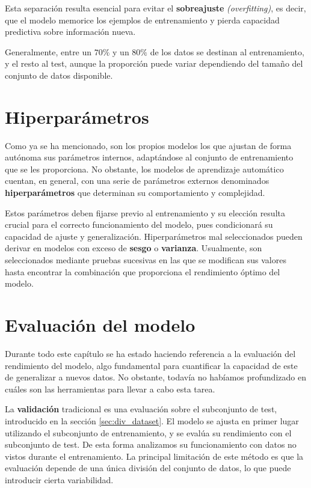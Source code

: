 \documentclass[titlepage, 11pt]{book}
\begin{document}
Esta separación resulta esencial para evitar el \textbf{sobreajuste} \textit{(overfitting)}, es decir, que el modelo memorice los ejemplos de entrenamiento y pierda capacidad predictiva sobre información nueva.

Generalmente, entre un $70\%$ y un $80\%$ de los datos se destinan al entrenamiento, y el resto al test, aunque la proporción puede variar dependiendo del tamaño del conjunto de datos disponible.

\section{Hiperparámetros}
Como ya se ha mencionado, son los propios modelos los que ajustan de forma autónoma sus parámetros internos, adaptándose al conjunto de entrenamiento que se les proporciona. No obstante, los modelos de aprendizaje automático cuentan, en general, con una serie de parámetros externos denominados \textbf{hiperparámetros} que determinan su comportamiento y complejidad.

Estos parámetros deben fijarse previo al entrenamiento y su elección resulta crucial para el correcto funcionamiento del modelo, pues condicionará su capacidad de ajuste y generalización. Hiperparámetros mal seleccionados pueden derivar en modelos con exceso de \textbf{sesgo} o \textbf{varianza}. Usualmente, son seleccionados mediante pruebas sucesivas en las que se modifican sus valores hasta encontrar la combinación que proporciona el rendimiento óptimo del modelo.

\section{Evaluación del modelo}
Durante todo este capítulo se ha estado haciendo referencia a la evaluación del rendimiento del modelo, algo fundamental para cuantificar la capacidad de este de generalizar a nuevos datos. No obstante, todavía no habíamos profundizado en cuáles son las herramientas para llevar a cabo esta tarea.

La \textbf{validación} tradicional es una evaluación sobre el subconjunto de test, introducido en la sección \ref{sec:div_dataset}. El modelo se ajusta en primer lugar utilizando el subconjunto de entrenamiento, y se evalúa su rendimiento con el subconjunto de test. De esta forma analizamos su funcionamiento con datos no vistos durante el entrenamiento. La principal limitación de este método es que la evaluación depende de una única división del conjunto de datos, lo que puede introducir cierta variabilidad.
\end{document}
